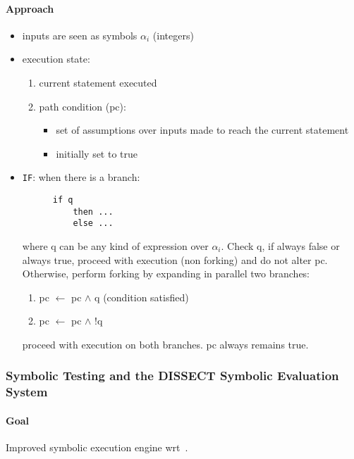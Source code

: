 \paragraph{Approach}     
  \begin{itemize}   
    
    \item inputs are seen as symbols ${\alpha}_i$ (integers)
    
    \item execution state:
      \begin{enumerate}
        \item current statement executed
        \item path condition (pc): 
          \begin{itemize}
            \item set of assumptions over inputs made to reach the current statement
            \item initially set to true
          \end{itemize}
      \end{enumerate}

      \item {\tt IF}: when there is a branch: 
        \begin{lstlisting}
      if q
          then ...
          else ...
        \end{lstlisting}
        where q can be any kind of expression over ${\alpha}_i$. Check q, if always false or always true, proceed with
        execution (non forking) and do not alter pc. Otherwise, perform forking by expanding in parallel two branches:
        \begin{enumerate}
          \item pc $\gets$ pc $\wedge$ q (condition satisfied)
          \item pc $\gets$ pc $\wedge$ !q
        \end{enumerate}
        proceed with execution on both branches. pc always remains true.

  \end{itemize}

\subsubsection{\cite{H-TSE77} Symbolic Testing and the DISSECT Symbolic Evaluation System} 

  \paragraph{Goal} 
  Improved symbolic execution engine wrt~\cite{K-ACM76}.


